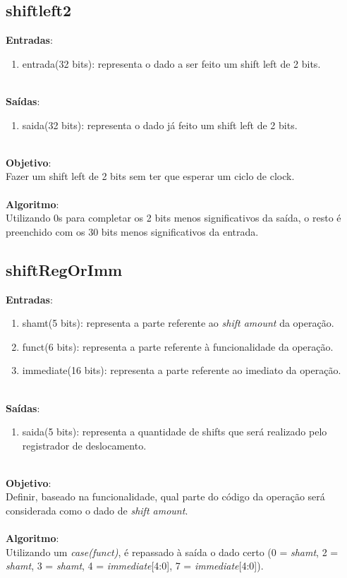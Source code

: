 \documentclass{article}
\begin{document}
    \subsection{shiftleft2}
    \textbf{Entradas}:
    \begin{enumerate}
        \item entrada(32 bits): representa o dado a ser feito um shift left de 2 bits.\\
    \end{enumerate}
    \\
    \textbf{Saídas}:
    \begin{enumerate}
        \item saida(32 bits): representa o dado já feito um shift left de 2 bits.\\
    \end{enumerate}
    \\
    \textbf{Objetivo}:\\
    Fazer um shift left de 2 bits sem ter que esperar um ciclo de clock.
    \\
    \\
    \textbf{Algoritmo}:\\
    Utilizando 0s para completar os 2 bits menos significativos da saída, o resto é preenchido com os 30 bits menos significativos da entrada.
    \\

    \subsection{shiftRegOrImm}
    \textbf{Entradas}:
    \begin{enumerate}
        \item shamt(5 bits): representa a parte referente ao {\it shift amount} da operação.
        \item funct(6 bits): representa a parte referente à funcionalidade da operação.
        \item immediate(16 bits): representa a parte referente ao imediato da operação.\\
    \end{enumerate}
    \\
    \textbf{Saídas}:
    \begin{enumerate}
        \item saida(5 bits): representa a quantidade de shifts que será realizado pelo registrador de deslocamento.\\
    \end{enumerate}
    \\
    \textbf{Objetivo}:\\
    Definir, baseado na funcionalidade, qual parte do código da operação será considerada como o dado de {\it shift amount}.
    \\
    \\
    \textbf{Algoritmo}:\\
    Utilizando um {\it case(funct)}, é repassado à saída o dado certo (0 = {\it shamt}, 2 = {\it shamt}, 3 = {\it shamt}, 4 = {\it immediate}[4:0], 7 = {\it immediate}[4:0]).
    
\end{document}
